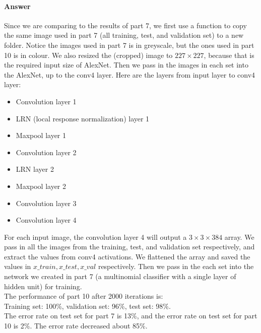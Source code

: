 \documentclass[11pt,twoside]{article}
\begin{document}
\paragraph{Answer}
Since we are comparing to the results of part 7, we first use a function to copy the same image used in part 7 (all training, test, and validation set) to a new folder. Notice the images used in part 7 is in greyscale, but the ones used in part 10 is in colour. We also resized the (cropped) image to $227\times227$, because that is the required input size of AlexNet. 
Then we pass in the images in each set into the AlexNet, up to the conv4 layer. Here are the layers from input layer to conv4 layer:
\begin {itemize}
	\item Convolution layer 1
	\item LRN (local response normalization) layer 1
	\item Maxpool layer 1
	\item Convolution layer 2
	\item LRN layer 2
	\item Maxpool layer 2
	\item Convolution layer 3
	\item Convolution layer 4
\end {itemize}
For each input image, the convolution layer 4 will output a $3\times3\times384$ array. We pass in all the images from the training, test, and validation set respectively, and extract the values from conv4 activations. We flattened the array and saved the values in $x\_train, x\_test, x\_val$ respectively. Then we pass in the each set into the network we created in part 7 (a multinomial classifier with a single layer of hidden unit) for training.\\
The performance of part 10 after 2000 iterations is:\\
Training set: 100\%, validation set: 96\%, test set: 98\%.\\
The error rate on test set for part 7 is 13\%, and the error rate on test set for part 10 is 2\%. The error rate decreased about 85\%.

\clearpage
\end{document}
